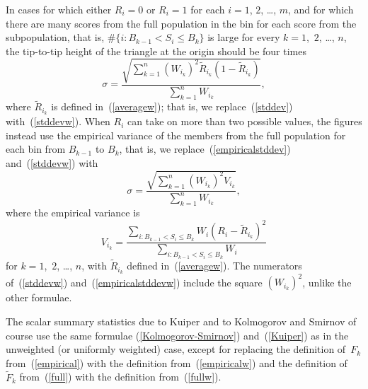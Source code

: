 \documentclass{article}
\begin{document}
In cases for which either $R_i = 0$ or $R_i = 1$
for each $i = 1$, $2$, \dots, $m$,
and for which there are many scores from the full population in the bin
for each score from the subpopulation, that is,
$\#\{i : B_{k-1} < S_i \le B_k\}$ is large for every $k = 1$,~$2$, \dots, $n$,
the tip-to-tip height of the triangle at the origin should be four times
%
\begin{equation}
\label{stddevw}
\sigma
= \frac{\sqrt{\sum_{k=1}^n (W_{i_k})^2 \tilde{R}_{i_k} (1-\tilde{R}_{i_k})}}
       {\sum_{k=1}^n W_{i_k}},
\end{equation}
%
where $\tilde{R}_{i_k}$ is defined in~(\ref{averagew});
that is, we replace~(\ref{stddev}) with~(\ref{stddevw}).
When $R_i$ can take on more than two possible values,
the figures instead use the empirical variance
of the members from the full population for each bin from $B_{k-1}$ to $B_k$,
that is, we replace~(\ref{empiricalstddev}) and~(\ref{stddevw}) with
%
\begin{equation}
\label{empiricalstddevw}
\sigma = \frac{\sqrt{\sum_{k=1}^n (W_{i_k})^2 V_{i_k}}}{\sum_{k=1}^n W_{i_k}},
\end{equation}
%
where the empirical variance is
%
\begin{equation}
V_{i_k} = \frac{\sum_{i : B_{k-1} < S_i \le B_k} W_i (R_i - \tilde{R}_{i_k})^2}
               {\sum_{i : B_{k-1} < S_i \le B_k} W_i}
\end{equation}
%
for $k = 1$,~$2$, \dots, $n$,
with $\tilde{R}_{i_k}$ defined in~(\ref{averagew}).
The numerators of~(\ref{stddevw}) and~(\ref{empiricalstddevw})
include the square $(W_{i_k})^2$, unlike the other formulae.

The scalar summary statistics due to Kuiper and to Kolmogorov and Smirnov
of course use the same formulae (\ref{Kolmogorov-Smirnov}) and~(\ref{Kuiper})
as in the unweighted (or uniformly weighted) case,
except for replacing the definition of~$F_k$ from~(\ref{empirical})
with the definition from~(\ref{empiricalw})
and the definition of~$\tilde{F}_k$ from~(\ref{full})
with the definition from~(\ref{fullw}).
\end{document}
